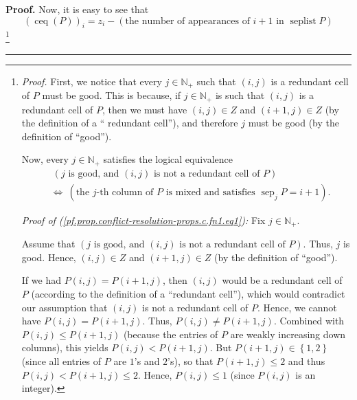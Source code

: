 \documentclass[numbers=enddot,12pt,final,onecolumn,notitlepage]{scrartcl}%
\theoremstyle{definition}
\newenvironment{proof}[1][Proof]{\noindent\textbf{#1.} }{\ \rule{0.5em}{0.5em}}
\newenvironment{verlong}{}{}
\begin{document}
\begin{verlong}
\begin{proof}
Now, it is easy to see that%
\[
\left(  \operatorname*{ceq}\left(  P\right)  \right)  _{i}=z_{i}-\left(
\text{the number of appearances of }i+1\text{ in }\operatorname*{seplist}%
P\right)
\]
\footnote{\textit{Proof.} First, we notice that every $j\in\mathbb{N}_{+}$
such that $\left(  i,j\right)  $ is a redundant cell of $P$ must be good. This
is because, if $j\in\mathbb{N}_{+}$ is such that $\left(  i,j\right)  $ is a
redundant cell of $P$, then we must have $\left(  i,j\right)  \in Z$ and
$\left(  i+1,j\right)  \in Z$ (by the definition of a \textquotedblleft
redundant cell\textquotedblright), and therefore $j$ must be good (by the
definition of \textquotedblleft good\textquotedblright).
\par
Now, every $j\in\mathbb{N}_{+}$ satisfies the logical equivalence%
\begin{align}
&  \ \left(  j\text{ is good, and }\left(  i,j\right)  \text{ is not a
redundant cell of }P\right) \nonumber\\
&  \Longleftrightarrow\ \left(  \text{the }j\text{-th column of }P\text{ is
mixed and satisfies }\operatorname*{sep}\nolimits_{j}P=i+1\right)  .
\label{pf.prop.conflict-resolution-props.c.fn1.eq1}%
\end{align}
\par
\textit{Proof of (\ref{pf.prop.conflict-resolution-props.c.fn1.eq1}):} Fix
$j\in\mathbb{N}_{+}$.
\par
Assume that $\left(  j\text{ is good, and }\left(  i,j\right)  \text{ is not a
redundant cell of }P\right)  $. Thus, $j$ is good. Hence, $\left(  i,j\right)
\in Z$ and $\left(  i+1,j\right)  \in Z$ (by the definition of
\textquotedblleft good\textquotedblright).
\par
If we had $P\left(  i,j\right)  =P\left(  i+1,j\right)  $, then $\left(
i,j\right)  $ would be a redundant cell of $P$ (according to the definition of
a \textquotedblleft redundant cell\textquotedblright), which would contradict
our assumption that $\left(  i,j\right)  $ is not a redundant cell of $P$.
Hence, we cannot have $P\left(  i,j\right)  =P\left(  i+1,j\right)  $. Thus,
$P\left(  i,j\right)  \neq P\left(  i+1,j\right)  $. Combined with $P\left(
i,j\right)  \leq P\left(  i+1,j\right)  $ (because the entries of $P$ are
weakly increasing down columns), this yields $P\left(  i,j\right)  <P\left(
i+1,j\right)  $. But $P\left(  i+1,j\right)  \in\left\{  1,2\right\}  $ (since
all entries of $P$ are $1$'s and $2$'s), so that $P\left(  i+1,j\right)
\leq2$ and thus $P\left(  i,j\right)  <P\left(  i+1,j\right)  \leq2$. Hence,
$P\left(  i,j\right)  \leq1$ (since $P\left(  i,j\right)  $ is an integer).
}
\end{proof}
\end{verlong}
\end{document}
